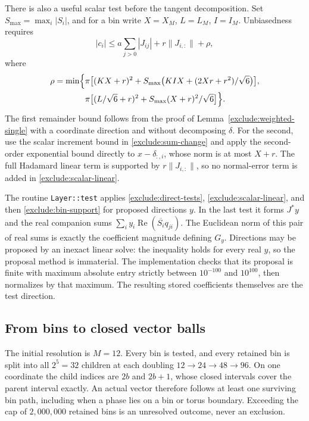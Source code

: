 There is also a useful scalar test before the tangent decomposition.
Set $S_{\max}=\max_i|S_i|$, and for a bin write
$X=X_M$, $L=L_M$, $I=I_M$.  Unbiasedness requires
\begin{equation}
 |c_i|\le a\sum_{j>0}|J_{ij}|+r\|J_{i,:}\|+\rho,
 \label{exclude:scalar-linear}
\end{equation}
where
\begin{align}
 \rho=\min\Bigl\{&
 \pi\bigl[(KX+r)^2+
   S_{\max}\bigl(KIX+(2Xr+r^2)/\sqrt6\bigr)\bigr],\notag\\
 &\pi\bigl[(L/\sqrt6+r)^2+
   S_{\max}(X+r)^2/\sqrt6\bigr]\Bigr\}.
 \label{exclude:scalar-remainder}
\end{align}
The first remainder bound follows from the proof of
Lemma~\ref{exclude:weighted-single} with a coordinate direction and
without decomposing $\delta$.
For the second, use the scalar increment bound in
\eqref{exclude:sum-change} and apply the second-order exponential
bound directly to $x-\delta_{:,i}$, whose norm is at most $X+r$.
The full Hadamard linear term is supported by $r\|J_{i,:}\|$,
so no normal-error term is added in \eqref{exclude:scalar-linear}.

The routine \texttt{Layer::test} applies
\eqref{exclude:direct-tests}, \eqref{exclude:scalar-linear}, and then
\eqref{exclude:bin-support} for proposed directions $y$.
In the last test it forms $J^*y$ and the real companion sums
$\sum_i y_i\operatorname{Re}(\overline{S_i}q_{ji})$.
The Euclidean norm of this pair of real sums is exactly the coefficient
magnitude defining $G_y$.
Directions may be proposed by an inexact linear solve: the inequality
holds for every real $y$, so the proposal method is immaterial.
The implementation checks that its proposal is finite with maximum
absolute entry strictly between $10^{-100}$ and $10^{100}$, then
normalizes by that maximum.  The resulting stored coefficients
themselves are the test direction.

\subsection{From bins to closed vector balls}

The initial resolution is $M=12$.  Every bin is tested, and every
retained bin is split into all $2^5=32$ children at each doubling
$12\to24\to48\to96$.  On one coordinate the child indices are $2b$
and $2b+1$, whose closed intervals cover the parent interval exactly.
An actual vector therefore follows at least one surviving bin path,
including when a phase lies on a bin or torus boundary.
Exceeding the cap of $2{,}000{,}000$ retained bins is an unresolved
outcome, never an exclusion.

